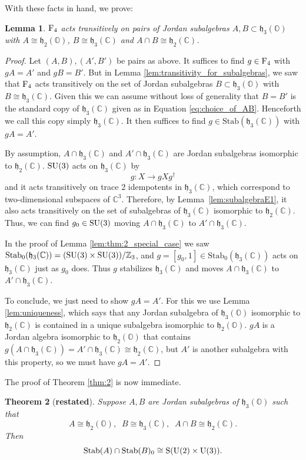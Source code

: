 \documentclass{article}
\theoremstyle{plain}
\newtheorem{thm}{Theorem}
\newtheorem{lem}[thm]{Lemma}
\theoremstyle{remark}
\theoremstyle{definition}
\newcommand{\maps}{\colon}    %
\newcommand{\C}{{\mathbb C}}  %
\newcommand{\Z}{{\mathbb Z}}  %
\renewcommand{\O}{{\mathbb O}}  %
\newcommand{\U}{{\rm U}}    %
\newcommand{\SU}{{\rm SU}}    %
\newcommand{\F}{{\rm F}}       %
\newcommand{\Stab}{\mathrm{Stab}} %
\renewcommand{\S}{\mathrm{S}} %
\newcommand{\h}{\mathfrak{h}}  %
\begin{document}
With these facts in hand, we prove:

\begin{lem}
\label{lem:transitivity_for_pairs}
$\F_4$ acts transitively on pairs of Jordan subalgebras $A,B \subset \h_3(\O)$ with $A \cong \h_2(\O)$, $B \cong \h_3(\C)$ and $A \cap B \cong \h_2(\C)$.
\end{lem}

\begin{proof} 
Let $(A,B), (A',B')$ be pairs as above.  It suffices to find $g \in \F_4$ with $g A = A'$ and $g B = B'$.  But in Lemma \ref{lem:transitivity_for_subalgebras}, we saw that $\F_4$ acts transitively on the set of Jordan subalgebras $B \subset \h_3(\O)$  with  $B \cong \h_3(\C)$.   Given this we can assume without loss of generality that $B= B'$ is the standard copy of $\h_3(\C)$ given as in Equation \eqref{eq:choice_of_AB}.  Henceforth we call this copy simply $\h_3(\C)$.  It then suffices to find $g \in \Stab(\h_3(\C))$ with $g A = A'$.

By assumption, $A \cap \h_3(\C)$ and $A' \cap \h_3(\C)$ are Jordan subalgebras isomorphic to $\h_2(\C)$.    $\SU(3)$ acts on $\h_3(\C)$ by
\[          g \maps X \to g X g^\dagger  \]
and it acts transitively on trace $2$ idempotents in $\h_3(\C)$, which correspond to two-dimensional subspaces of $\C^3$. Therefore, by Lemma~\ref{lem:subalgebraE1}, it also acts transitively on the set of subalgebras of $\h_3(\C)$ isomorphic to $\h_2(\C)$. Thus, we can find $g_0 \in \SU(3)$ moving $A \cap \h_3(\C) $ to $A' \cap \h_3(\C)$. 

In the proof of Lemma \ref{lem:thm:2_special_case} we saw $\Stab_0(\h_3(\C)) = (\SU(3) \times \SU(3))/\Z_3$, and  $g = [g_0,1] \in \Stab_0(\h_3(\C))$ acts on $\h_3(\C)$ just as $g_0$ does.   Thus $g$ stabilizes $\h_3(\C)$ and moves $A \cap \h_3(\C)$ to $A' \cap \h_3(\C)$.   

To conclude, we just need to show $gA = A'$.   For this we use Lemma \ref{lem:uniqueness}, which says that any Jordan subalgebra of $\h_3(\O)$ isomorphic to $\h_2(\C)$ is contained in a unique subalgebra isomorphic to $\h_2(\O)$.  $gA$ is a Jordan algebra isomorphic to $\h_2(\O)$ that contains  $g(A \cap \h_3(\C)) = A' \cap \h_3(\C)  \cong \h_2(\C)$, but $A'$ is another subalgebra with this property, so we must have $g A = A'$.   
\end{proof}

The proof of Theorem \ref{thm:2} is now immediate.

\addtocounter{thm}{-10}%
\begin{thm}[\textup{\textbf{restated}}]
Suppose $A,B$ are Jordan subalgebras of $\h_3(\O)$ such that
\[  A \cong \h_2(\O), \;\; B \cong \h_3(\C), \;\; A \cap B \cong \h_2(\C) . \]
Then 
\[     \Stab(A) \cap \Stab(B)_0 \cong \S(\U(2) \times \U(3)) .\]
\end{thm}
\end{document}
